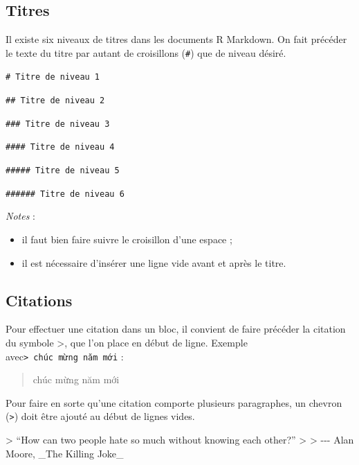 \documentclass[
  11pt,
]{book}
\newenvironment{Shaded}{\begin{snugshade}}{\end{snugshade}}
\newcommand{\AttributeTok}[1]{\textcolor[rgb]{0.77,0.63,0.00}{#1}}
\providecommand{\tightlist}{%
  \setlength{\itemsep}{0pt}\setlength{\parskip}{0pt}}
\numberwithin{equation}{section}
\numberwithin{countremarque}{section}
\newenvironment{notebox}{
  \begin{tcolorbox}[breakable, colback=jaune,coltext=black,
                  colframe=grisfonce]}
 {\end{tcolorbox}}
\begin{document}
\hypertarget{titres}{%
\subsection{Titres}\label{titres}}

Il existe six niveaux de titres dans les documents R Markdown. On fait précéder le texte du titre par autant de croisillons (\texttt{\#}) que de niveau désiré.

\texttt{\#\ Titre\ de\ niveau\ 1}

\texttt{\#\#\ Titre\ de\ niveau\ 2}

\texttt{\#\#\#\ Titre\ de\ niveau\ 3}

\texttt{\#\#\#\#\ Titre\ de\ niveau\ 4}

\texttt{\#\#\#\#\#\ Titre\ de\ niveau\ 5}

\texttt{\#\#\#\#\#\#\ Titre\ de\ niveau\ 6}

\begin{notebox}

\emph{Notes} :

\begin{itemize}
\tightlist
\item
  il faut bien faire suivre le croisillon d'une espace ;
\item
  il est nécessaire d'insérer une ligne vide avant et après le titre.
\end{itemize}

\end{notebox}

\hypertarget{citations}{%
\subsection{Citations}\label{citations}}

Pour effectuer une citation dans un bloc, il convient de faire précéder la citation du symbole \textgreater, que l'on place en début de ligne. Exemple avec\texttt{\textgreater{}\ chúc\ mừng\ năm\ mới} :

\begin{quote}
chúc mừng năm mới
\end{quote}

Pour faire en sorte qu'une citation comporte plusieurs paragraphes, un chevron (\texttt{\textgreater{}}) doit être ajouté au début de lignes vides.

\begin{Shaded}
\begin{Highlighting}[]
\AttributeTok{\textgreater{} “How can two people hate so much without knowing each other?”}
\AttributeTok{\textgreater{}}
\AttributeTok{\textgreater{} {-}{-}{-} Alan Moore, \_The Killing Joke\_}
\end{Highlighting}
\end{Shaded}
\end{document}
